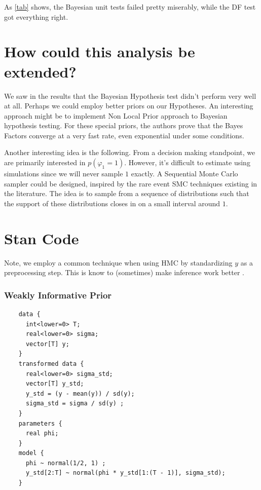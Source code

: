 \documentclass{article}
\theoremstyle{definition}
\theoremstyle{exercise}
\theoremstyle{remark}
\begin{document}
As \autoref{tab} shows, the Bayesian unit tests failed pretty miserably, while the DF test got everything right.


\section*{How could this analysis be extended?}%

We saw in the results that the Bayesian Hypothesis test didn't perform very well at all. Perhaps we could employ better priors on our Hypotheses. An interesting approach might be to implement \cite{johnson2010use} Non Local Prior approach to Bayesian hypothesis testing.
For these special priors, the authors prove that the Bayes Factors converge at a very fast rate, even exponential under some conditions.

Another interesting idea is the following. From a decision making standpoint, we are primarily interested in $p(\varphi_{1} = 1)$. However, it's difficult to estimate using simulations since we will never sample $1$ exactly.
A Sequential Monte Carlo sampler \citep{del2006sequential} could be designed, inspired by the rare event SMC techniques existing in the literature. The idea is to sample from a sequence of distributions such that the support of these distributions closes in on a small interval around $1$.






\newpage
\section*{Stan Code}
Note, we employ a common technique when using HMC by standardizing $y$ as a preprocessing step.
This is know to (sometimes) make inference work better \citep{gelman1995bayesian}.
\subsubsection*{Weakly Informative Prior}
\begin{verbatim}
    data {
      int<lower=0> T;
      real<lower=0> sigma;
      vector[T] y;
    }
    transformed data {
      real<lower=0> sigma_std;
      vector[T] y_std;
      y_std = (y - mean(y)) / sd(y);
      sigma_std = sigma / sd(y) ;
    }
    parameters {
      real phi;
    }
    model {
      phi ~ normal(1/2, 1) ;
      y_std[2:T] ~ normal(phi * y_std[1:(T - 1)], sigma_std);
    }
\end{verbatim}
\end{document}
